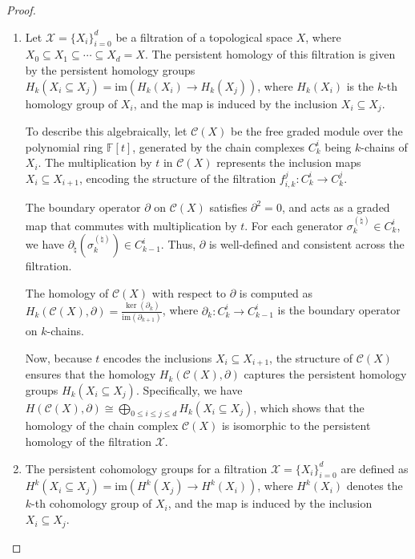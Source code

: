 \begin{proof}\noindent
\begin{enumerate}
\item Let \( \mathcal{X} = \{ X_i \}_{i=0}^d \) be a filtration of a topological space \( X \), where \( X_0 \subseteq X_1 \subseteq \cdots \subseteq X_d = X \). The persistent homology of this filtration is given by the persistent homology groups $H_k(X_i \subseteq X_j) = \mathrm{im} \left( H_k(X_i) \to H_k(X_j) \right)$, where \( H_k(X_i) \) is the \( k \)-th homology group of \( X_i \), and the map is induced by the inclusion \( X_i \subseteq X_j \).

To describe this algebraically, let \( \mathcal{C}(X) \) be the free graded module over the polynomial ring \( \mathbb{F}[t] \), generated by the chain complexes \( C_k^i \) being \( k \)-chains of \( X_i \). The multiplication by \( t \) in \( \mathcal{C}(X) \) represents the inclusion maps \( X_i \subseteq X_{i+1} \), encoding the structure of the filtration $f_{i,k}^j: C_k^i \to C_k^j$.

The boundary operator \( \partial \) on \( \mathcal{C}(X) \) satisfies \( \partial^2 = 0 \), and acts as a graded map that commutes with multiplication by \( t \). For each generator \( \sigma^{(\natural)}_k \in C_k^i \), we have $\partial_\natural(\sigma^{(\natural)}_k) \in C_{k-1}^i$. Thus, \( \partial \) is well-defined and consistent across the filtration.

The homology of \( \mathcal{C}(X) \) with respect to \( \partial \) is computed as $H_k(\mathcal{C}(X), \partial) = \frac{\ker(\partial_k)}{\mathrm{im}(\partial_{k+1})}$, where \( \partial_k: C_k^i \to C_{k-1}^i \) is the boundary operator on \( k \)-chains.

Now, because \( t \) encodes the inclusions \( X_i \subseteq X_{i+1} \), the structure of \( \mathcal{C}(X) \) ensures that the homology \( H_k(\mathcal{C}(X), \partial) \) captures the persistent homology groups \( H_k(X_i \subseteq X_j) \). Specifically, we have $H(\mathcal{C}(X), \partial) \cong \bigoplus_{0 \leq i \leq j \leq d} H_k(X_i \subseteq X_j)$, which shows that the homology of the chain complex \( \mathcal{C}(X) \) is isomorphic to the persistent homology of the filtration \( \mathcal{X} \).
\item The persistent cohomology groups for a filtration \( \mathcal{X} = \{ X_i \}_{i=0}^d \) are defined as $H^k(X_i \subseteq X_j) = \mathrm{im} \left( H^k(X_j) \to H^k(X_i) \right)$, where \( H^k(X_i) \) denotes the \( k \)-th cohomology group of \( X_i \), and the map is induced by the inclusion \( X_i \subseteq X_j \).


\end{enumerate}
\end{proof}
